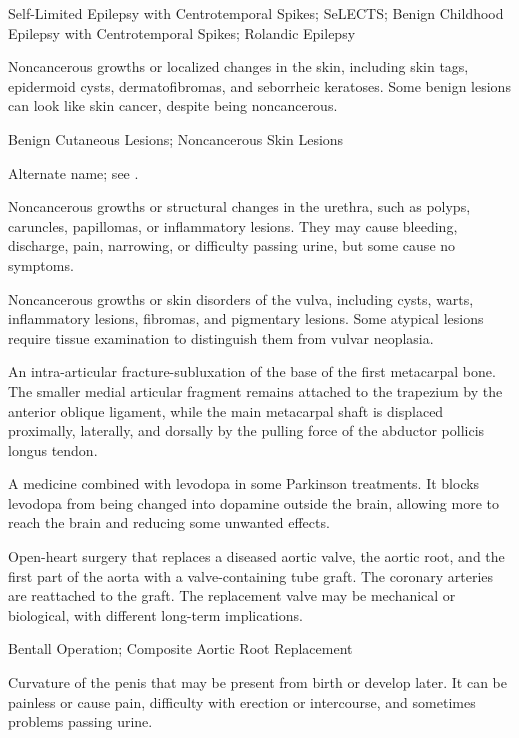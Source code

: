 \synonyms
Self-Limited Epilepsy with Centrotemporal Spikes; SeLECTS; Benign Childhood Epilepsy with Centrotemporal Spikes; Rolandic Epilepsy

 Noncancerous growths or localized changes in the skin, including skin tags, epidermoid cysts, dermatofibromas, and seborrheic keratoses. Some benign lesions can look like skin cancer, despite being noncancerous.

\synonyms
Benign Cutaneous Lesions; Noncancerous Skin Lesions

 Alternate name; see .

 Noncancerous growths or structural changes in the urethra, such as polyps, caruncles, papillomas, or inflammatory lesions. They may cause bleeding, discharge, pain, narrowing, or difficulty passing urine, but some cause no symptoms.

 Noncancerous growths or skin disorders of the
vulva, including cysts, warts, inflammatory lesions, fibromas, and pigmentary
lesions. Some atypical lesions require tissue examination to distinguish them
from vulvar neoplasia.

 An intra-articular fracture-subluxation of the base of the first metacarpal bone. The smaller medial articular fragment remains attached to the trapezium by the anterior oblique ligament, while the main metacarpal shaft is displaced proximally, laterally, and dorsally by the pulling force of the abductor pollicis longus tendon.

 A medicine combined with levodopa in some Parkinson treatments. It blocks levodopa from being changed into dopamine outside the brain, allowing more to reach the brain and reducing some unwanted effects.

 Open-heart surgery that replaces a diseased aortic
valve, the aortic root, and the first part of the aorta with a valve-containing
tube graft. The coronary arteries are reattached to the graft. The replacement
valve may be mechanical or biological, with different long-term implications.

\synonyms
Bentall Operation; Composite Aortic Root Replacement

 Curvature of the penis that may be present from birth or develop later. It can be painless or cause pain, difficulty with erection or intercourse, and sometimes problems passing urine.

